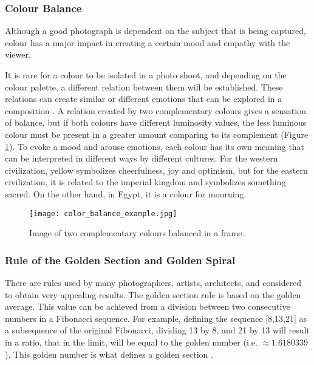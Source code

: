 \subsubsection{Colour Balance}
\label{subsub:colour_balance}

Although a good photograph is dependent on the subject that is being captured, colour has a major impact in creating a certain mood and empathy with the viewer. 

It is rare for a colour to be isolated in a photo shoot, and depending on the colour palette, a different relation between them will be established. These relations can create similar or different emotions that can be explored in a composition \cite{Santos}.
A relation created by two complementary colours gives a sensation of balance, but if both colours have different luminosity values, the less luminous colour must be present in a greater amount comparing to its complement (Figure \ref{fig:colour_balance_image}).
To evoke a mood and arouse emotions, each colour has its own meaning that can be interpreted in different ways by different cultures. For the western civilization, yellow symbolizes cheerfulness, joy and optimism, but for the eastern civilization, it is related to the imperial kingdom and symbolizes something sacred. On the other hand, in Egypt, it is a colour for mourning.

\begin{figure}[htbp]
    \centering
	\label{fig:colour_balance_example}
    \texttt{[image: color\_balance\_example.jpg]}
  \caption{Image of two complementary colours balanced in a frame. \cite{Santos}}
  \label{fig:colour_balance_image}
\end{figure}

\subsubsection{Rule of the Golden Section and Golden Spiral}
\label{subsub:golden_section}

There are rules used by many photographers, artists, architects, and considered to obtain very appealing results. The golden section rule is based on the golden average. This value can be achieved from a division between two consecutive numbers in a Fibonacci sequence. For example, defining the sequence [8,13,21] as a subsequence of the original Fibonacci, dividing 13 by 8, and 21 by 13 will result in a ratio, that in the limit, will be equal to the golden number (i.e. $\approx 1.6180339$). This golden number is what defines a golden section \cite{Santos}. 

